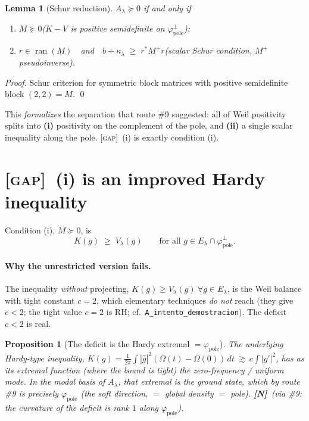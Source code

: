 \documentclass[11pt]{article}
\newcommand{\NM}{\textcolor{blue!70!black}{\textbf{[N]}}}
\newcommand{\GAP}{\textcolor{red!75!black}{\textsc{[gap]}}}
\theoremstyle{plain}
\newtheorem{lemma}{Lemma}
\newtheorem{proposition}{Proposition}
\theoremstyle{definition}
\newcommand{\El}{E_\lambda}
\newcommand{\kin}{K}
\newcommand{\vv}{V}
\newcommand{\fp}{\varphi_{\mathrm{pole}}}
\DeclareMathOperator{\ran}{ran}
\begin{document}
\begin{lemma}[Schur reduction]\label{lem:schur}
$A_\lambda\succeq0$ \emph{if and only if}
\begin{enumerate}[label=\textbf{(\roman*)},leftmargin=2.2em]
\item $M\succeq0$\quad($\kin-\vv$ is positive semidefinite on $\fp^\perp$);
\item $r\in\ran(M)$\ \ and\ \ $b+\kappa_\lambda\;\ge\;r^*M^{+}r$\quad(scalar Schur
condition, $M^+$ pseudoinverse).
\end{enumerate}
\end{lemma}
\begin{proof}
Schur criterion for symmetric block matrices with positive semidefinite block
$(2,2)=M$. \qed
\end{proof}

\noindent This \emph{formalizes} the separation that route \#9 suggested: all of Weil
positivity splits into \textbf{(i)} positivity on the complement of the pole,
and \textbf{(ii)} a single scalar inequality along the pole. \GAP\ (i) is
exactly condition (i).

\section{\GAP\ (i) is an improved Hardy inequality}\label{sec:hardy}

Condition (i), $M\succeq0$, is
\begin{equation}\label{eq:gapi}
  \kin(g)\;\ge\;\vv_\lambda(g)\qquad\text{for all }g\in\El\cap\fp^\perp .
\end{equation}

\paragraph{Why the unrestricted version fails.}
The inequality \emph{without} projecting, $\kin(g)\ge\vv_\lambda(g)\ \forall g\in\El$, is
the Weil balance with tight constant $c=2$, which elementary techniques \emph{do not}
reach (they give $c<2$; the tight value $c=2$ is RH; cf.\
\texttt{A\_intento\_demostracion}). The deficit $c<2$ is real.

\begin{proposition}[The deficit is the Hardy extremal $=\fp$]\label{prop:extremal}
The underlying Hardy-type inequality,
$\kin(g)=\frac1{2\pi}\int|\widehat g|^2(\Omega(t)-\Omega(0))\,dt\ \gtrsim\
c\int|g'|^2$, has as its \emph{extremal} function (where the bound is tight) the
\emph{zero-frequency} / uniform mode. In the modal basis of $A_\lambda$, that extremal
is the ground state, which by route \#9 is precisely $\fp$ (the soft direction,
$=$ global density $=$ pole). \NM\ (via \#9: the curvature of the deficit is rank $1$
along $\fp$).
\end{proposition}
\end{document}

